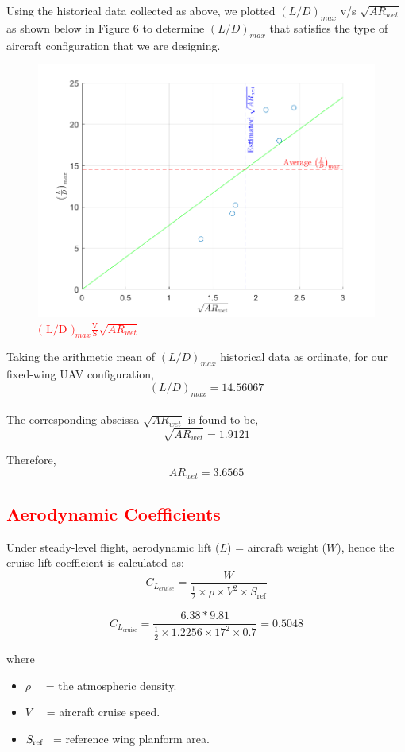 \documentclass[12 pt]{article}
\begin{document}
Using the historical data collected as above, we plotted ${{(L/D)}_{max}}$ v/s $\sqrt{AR_{wet}}$ as shown below in Figure 6 to determine ${{(L/D)}_{max}}$ that satisfies the type of aircraft configuration that we are designing.
\newpage
\begin{figure}
    \centering
    \includegraphics[width=0.8\linewidth]{Codes/Week 3/AR_wergraph.png}
    \caption{\textcolor{red}{$\text{( L/D )}_{max} \frac{\text{V}}{\text{S}} \sqrt{AR_{wet}}$ }}
    \label{Data Collection}
\end{figure}

Taking the arithmetic mean of ${( L/D )}_{max}$ historical data as ordinate, for our fixed-wing UAV configuration, $${( L/D )}_{max} = 14.56067 $$\\

The corresponding abscissa $\sqrt{{AR}_{wet}}$ is found to be,\\

$$\sqrt{{AR}_{wet}} = 1.9121$$

Therefore, $${AR}_{wet} = 3.6565$$

\subsection{\textcolor{red}{Aerodynamic Coefficients}}
Under steady-level flight, aerodynamic lift ($L$) = aircraft weight ($W$), hence the cruise lift coefficient is calculated as:
\[
C_{L_{cruise}} = \frac{W}{\frac{1}{2} \times \rho \times V^2 \times S_{\text{ref}}}
\tag{3.2}\]

\[
C_{L_{\text{cruise}}} = \frac{6.38*9.81}{\frac{1}{2} \times 1.2256 \times 17^2 \times 0.7} = 0.5048
\]

where 
\begin{itemize}
  \item[] $\rho \quad$ = the atmospheric density.
  \item[] $V \quad$ = aircraft cruise speed.
  \item[] $S_{\text{ref} \hspace{0.5em}}$ = reference wing planform area.\\
\end{itemize}
\end{document}
